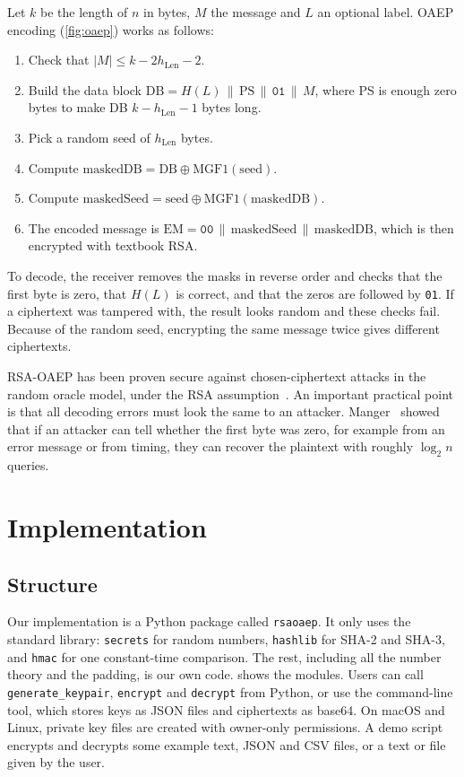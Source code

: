 \documentclass[runningheads]{llncs}
\newcommand{\hlen}{h_{\mathrm{Len}}}
\newcommand{\xor}{\oplus}
\newcommand{\concat}{\,\|\,}
\newcommand{\code}[1]{\texttt{#1}}
\begin{document}
Let $k$ be the length of $n$ in bytes, $M$ the message and $L$ an optional
label. OAEP encoding (\cref{fig:oaep}) works as follows:
\begin{enumerate}
  \item Check that $|M| \le k - 2\hlen - 2$.
  \item Build the data block $\mathrm{DB} = H(L) \concat \mathrm{PS} \concat
        \mathtt{01} \concat M$, where PS is enough zero bytes to make DB
        $k - \hlen - 1$ bytes long.
  \item Pick a random seed of $\hlen$ bytes.
  \item Compute $\mathrm{maskedDB} = \mathrm{DB} \xor \mathrm{MGF1}(\mathrm{seed})$.
  \item Compute $\mathrm{maskedSeed} = \mathrm{seed} \xor \mathrm{MGF1}(\mathrm{maskedDB})$.
  \item The encoded message is $\mathrm{EM} = \mathtt{00} \concat
        \mathrm{maskedSeed} \concat \mathrm{maskedDB}$, which is then encrypted
        with textbook RSA.
\end{enumerate}
To decode, the receiver removes the masks in reverse order and checks that
the first byte is zero, that $H(L)$ is correct, and that the zeros are
followed by \texttt{01}. If a ciphertext was tampered with, the result looks
random and these checks fail. Because of the random seed, encrypting the same
message twice gives different ciphertexts.

RSA-OAEP has been proven secure against chosen-ciphertext attacks in the
random oracle model, under the RSA assumption~\cite{fops2001,pointcheval2002}.
An important practical point is that all decoding errors must look the same
to an attacker. Manger~\cite{manger2001} showed that if an attacker can tell
whether the first byte was zero, for example from an error message or from
timing, they can recover the plaintext with roughly $\log_2 n$ queries.

\section{Implementation}\label{sec:impl}

\subsection{Structure}

Our implementation is a Python package called \code{rsaoaep}. It only uses
the standard library: \code{secrets} for random numbers, \code{hashlib} for
SHA-2 and SHA-3, and \code{hmac} for one constant-time comparison. The rest,
including all the number theory and the padding, is our own code.
 shows the modules. Users can call
\code{generate\_keypair}, \code{encrypt} and \code{decrypt} from Python, or
use the command-line tool, which stores keys as JSON files and ciphertexts as
base64. On macOS and Linux, private key files are created with owner-only
permissions. A demo script encrypts and decrypts some example text, JSON and
CSV files, or a text or file given by the user.
\end{document}
